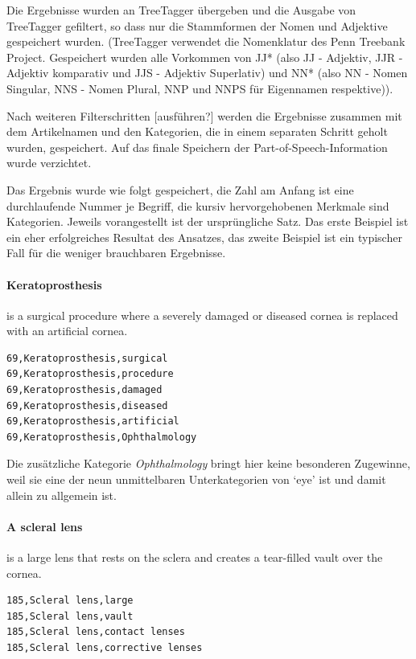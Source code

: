 \documentclass[pagesize,DIV=calc,12pt,draft]{scrreprt}
\begin{document}
\begin{inparaenum}
Die Ergebnisse wurden an TreeTagger übergeben und die Ausgabe von TreeTagger gefiltert, so dass nur die Stammformen der Nomen und Adjektive gespeichert wurden. (TreeTagger verwendet die Nomenklatur des Penn Treebank Project. 
Gespeichert wurden alle Vorkommen von JJ* (also JJ - Adjektiv, JJR - Adjektiv komparativ und JJS - Adjektiv Superlativ) und NN* (also NN - Nomen Singular, NNS - Nomen Plural, NNP und NNPS für Eigennamen respektive)). 

\item Nach weiteren Filterschritten {[}ausführen?{]} werden die Ergebnisse zusammen mit dem Artikelnamen und den Kategorien, die in einem separaten Schritt geholt wurden, gespeichert. 
Auf das finale Speichern der Part-of-Speech-Information wurde verzichtet. 
\end{inparaenum}

Das Ergebnis wurde wie folgt gespeichert, die Zahl am Anfang ist eine durchlaufende Nummer je Begriff, die kursiv hervorgehobenen Merkmale sind Kategorien. 
Jeweils vorangestellt ist der ursprüngliche Satz. 
Das erste Beispiel ist ein eher erfolgreiches Resultat des Ansatzes, das zweite Beispiel ist ein typischer Fall für die weniger brauchbaren Ergebnisse. 

\paragraph{Keratoprosthesis} is a surgical procedure where a severely damaged or diseased cornea is replaced with an artificial cornea.

\begin{lstlisting}
69,Keratoprosthesis,surgical 
69,Keratoprosthesis,procedure
69,Keratoprosthesis,damaged 
69,Keratoprosthesis,diseased
69,Keratoprosthesis,artificial 
69,Keratoprosthesis,Ophthalmology
\end{lstlisting}

Die zusätzliche Kategorie \emph{Ophthalmology} bringt hier keine besonderen Zugewinne, weil sie eine der neun unmittelbaren Unterkategorien von `eye' ist und damit allein zu allgemein ist.

\paragraph{A scleral lens}
is a large lens that rests on the sclera and creates a tear-filled vault over the cornea.

\begin{lstlisting}
185,Scleral lens,large 
185,Scleral lens,vault 
185,Scleral lens,contact lenses 
185,Scleral lens,corrective lenses
\end{lstlisting}
\end{document}
